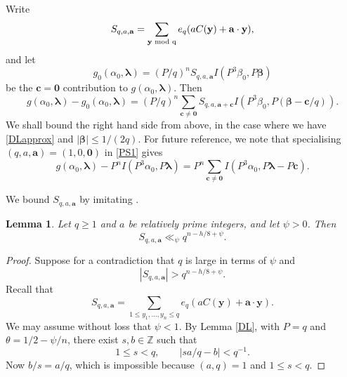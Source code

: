 \documentclass[12pt,reqno]{amsart}
\newtheorem{lemma}[thm]{Lemma}
\theoremstyle{definition}
\theoremstyle{remark}
\numberwithin{equation}{section}
\begin{document}
Write 
\begin{equation} \label{sumdef}
S_{q,a,{\mathbf a}} = \sum_{{\mathbf y} {\,\,\rm{mod}\,\,q}} e_q (aC({\mathbf y}) + {\mathbf a} \cdot {\mathbf y}),
\end{equation}
and let
\[
g_0({{\alpha}}_0, {{\boldsymbol {{\lambda}}}}) = (P/q)^n S_{q,a,{\mathbf a}} I(P^3 {{\beta}}_0, P{\boldsymbol{\beta}})
\]
be the ${\mathbf c} = {\mathbf 0}$ contribution to $g({{\alpha}}_0, {{\boldsymbol {{\lambda}}}})$. Then
\begin{equation} \label{PS1}
g({{\alpha}}_0, {{\boldsymbol {{\lambda}}}}) - g_0({{\alpha}}_0, {{\boldsymbol {{\lambda}}}})
= (P/q)^n \sum_{{\mathbf c} \ne {\mathbf 0}} S_{q,a,{\mathbf a} + {\mathbf c}} I(P^3 {{\beta}}_0, P({\boldsymbol{\beta}} - {\mathbf c} / q)).
\end{equation}
We shall bound the right hand side from above, in the case where we have \eqref{DLapprox} and $|{\boldsymbol{\beta}}| {\leqslant} 1/(2q)$. For future reference, we note that specialising \mbox{$(q,a,{\mathbf a}) = (1,0,{\mathbf 0})$} in \eqref{PS1} gives
\begin{equation} \label{PS2}
g({{\alpha}}_0, {{\boldsymbol {{\lambda}}}}) - P^n I(P^3 {{\alpha}}_0, P {{\boldsymbol {{\lambda}}}}) = P^n \sum_{{\mathbf c} \ne {\mathbf 0}} I(P^3 {{\alpha}}_0, P{{\boldsymbol {{\lambda}}}} - P{\mathbf c}).
\end{equation}

We bound $S_{q,a,{\mathbf a}}$ by imitating \cite[Lemma 15.3]{Dav2005}.

\begin{lemma} \label{Sbound}
Let $q {\geqslant} 1$ and $a$ be relatively prime integers, and let $\psi > 0$. Then
\begin{equation} \label{Sineq}
S_{q,a,{\mathbf a}} \ll_\psi q^{n-h/8+\psi}.
\end{equation}
\end{lemma}

\begin{proof} Suppose for a contradiction that $q$ is large in terms of $\psi$ and
\[
|S_{q,a,{\mathbf a}}| > q^{n-h/8+\psi}.
\]
Recall that 
\[
S_{q,a,{\mathbf a}} = \sum_{1 {\leqslant} y_1, \ldots, y_n {\leqslant} q} e_q(aC({\mathbf y}) + {\mathbf a} \cdot {\mathbf y}).
\]
We may assume without loss that $\psi < 1$. By Lemma \ref{DL}, with $P=q$ and ${{\theta}} = 1/2 - \psi/n$, there exist $s,b \in {\mathbb Z}$ such that 
\[
1 {\leqslant} s < q, \qquad |sa/q - b| < q^{-1}.
\]
Now $b/s = a/q$, which is impossible because $(a,q) = 1$ and $1 {\leqslant} s < q$.
\end{proof}
\end{document}
